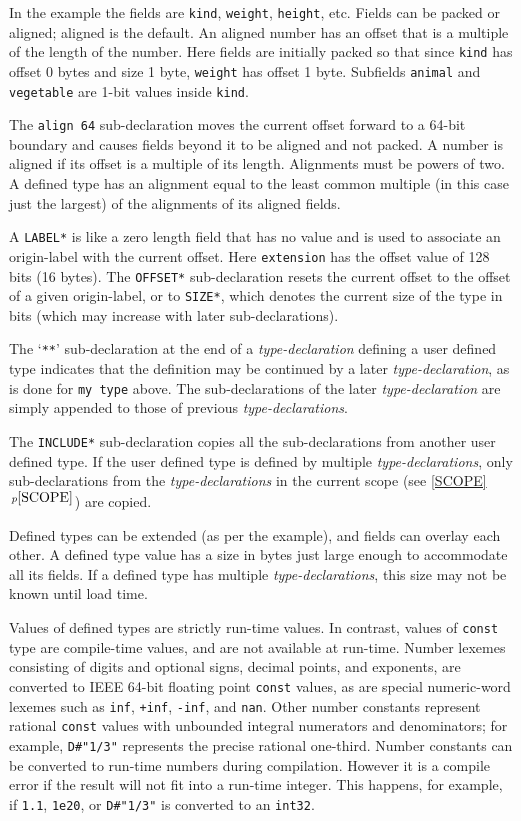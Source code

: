 \documentclass[12pt]{article}
\newcommand{\itemref}[1]{\ref{#1}$\,^{p\pageref{#1}}$}
\begin{document}
In the example the fields are {\tt kind}, {\tt weight}, {\tt height}, etc.
Fields can be packed or aligned; aligned is the default.  An aligned number has an offset
that is a multiple of the length of the number.
Here fields are initially packed
so that since {\tt kind} has offset 0 bytes and size 1 byte,
{\tt weight} has offset 1 byte.  Subfields {\tt animal}
and {\tt vegetable} are 1-bit values inside {\tt kind}.

The {\tt align 64} sub-declaration moves the current offset
forward to a 64-bit boundary and causes fields beyond it
to be aligned and not packed.  A number is aligned if
its offset is a multiple of its length.  Alignments must be powers of two.
A defined type has an
alignment equal to the least common multiple (in this case just the
largest) of the
alignments of its aligned fields.

A {\tt *LABEL*} is like a zero length field that has no value and
is used to associate an origin-label with the current offset.
Here {\tt extension} has the offset value of 128 bits (16 bytes).
The {\tt *OFFSET*} sub-declaration resets the current offset to the offset
of a given origin-label, or to {\tt *SIZE*}, which denotes the current
size of the type in bits (which may increase with later sub-declarations).

The `{\tt ***}' sub-declaration at the end of a
{\em type-declaration} defining a user defined type indicates
that the definition may be continued by a later {\em type-declaration},
as is done for {\tt my type} above.
The sub-declarations of the later {\em type-declaration} are
simply appended to those of previous {\em type-declarations}.

The {\tt *INCLUDE*} sub-declaration copies all the sub-declarations
from another user defined type.
If the user defined type is
defined by multiple {\em type-declarations}, only sub-declarations
from the {\em type-declarations} in the current scope (see \itemref{SCOPE})
are copied.

Defined types can be extended
(as per the example), and fields can overlay each other.
A defined type value has a size in bytes just large enough to
accommodate all its fields.  If a defined type has multiple
{\em type-declarations}, this size may not be known until load time.

Values of defined types are strictly run-time values.  In contrast,
values of {\tt const} type are compile-time values, and are
not available at run-time.  Number lexemes consisting of
digits and optional signs, decimal points, and exponents,
are converted to IEEE 64-bit floating point {\tt const} values, as are
special numeric-word lexemes such as {\tt inf}, {\tt +inf}, {\tt -inf}, and
{\tt nan}.  Other number constants represent
rational {\tt const} values with unbounded integral numerators
and denominators; for example,
{\tt D\#"1/3"} represents the precise rational one-third.
Number constants
can be converted to run-time numbers during compilation.
However it is a compile error
if the result will not fit into a run-time integer.
This happens, for example, if {\tt 1.1}, {\tt 1e20}, or {\tt D\#"1/3"}
is converted to an {\tt int32}.
\end{document}
